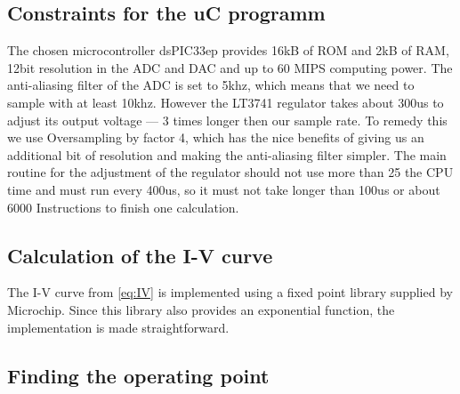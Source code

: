 

\subsection{Constraints for the uC programm}

The chosen microcontroller dsPIC33ep provides 16kB  of ROM and 2kB of RAM, 12bit
resolution  in  the  ADC  and  DAC  and  up  to  60  MIPS  computing  power. The
anti-aliasing filter of the ADC is set to 5khz, which  means  that  we  need  to
sample with at least 10khz. However the LT3741 regulator  takes  about  300us to
adjust  its  output  voltage  --- 3 times longer then our sample rate. To remedy
this  we use Oversampling by factor 4, which has the nice benefits of giving  us
an additional bit of resolution and making the anti-aliasing filter simpler. The
main routine for the adjustment of the regulator should not use more than 25%
the CPU  time and must run every 400us, so it must not take longer than 100us or
about 6000 Instructions to finish one calculation.


\subsection{Calculation of the I-V curve}

The  I-V  curve  from  \eqref{eq:IV} is implemented using a fixed point  library
supplied by Microchip. Since this library also provides an exponential function,
the implementation is made straightforward.


\subsection{Finding the operating point}
\label{subsec:finding-the-operating-point}

